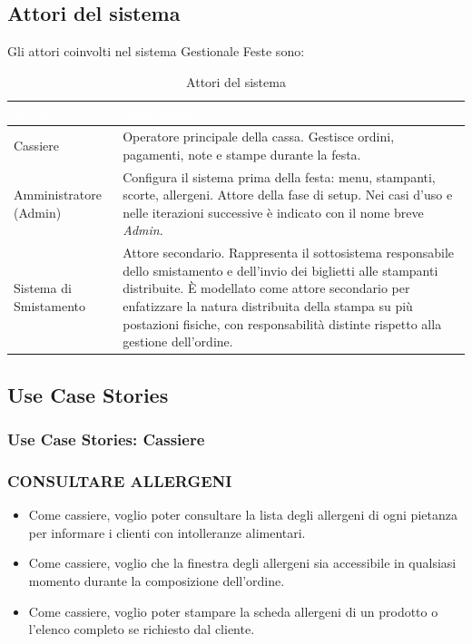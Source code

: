 
\subsection{Attori del sistema}
Gli attori coinvolti nel sistema Gestionale Feste sono:

\begin{table}[H]
\centering
\renewcommand{\arraystretch}{1.5}
\begin{tabularx}{\textwidth}{|L|X|}
\hline
{}\textcolor{white}{\textbf{Attore}} &
    \textcolor{white}{\textbf{Descrizione}} \\
\hline
Cassiere &
    Operatore principale della cassa. Gestisce ordini, pagamenti, note e stampe
    durante la festa. \\
\hline
Amministratore (Admin) &
    Configura il sistema prima della festa: menu, stampanti, scorte, allergeni.
    Attore della fase di setup. Nei casi d'uso e nelle iterazioni successive è
    indicato con il nome breve \emph{Admin}. \\
\hline
Sistema di Smistamento &
    Attore secondario. Rappresenta il sottosistema responsabile dello smistamento
    e dell'invio dei biglietti alle stampanti distribuite. \`E modellato come attore
    secondario per enfatizzare la natura distribuita della stampa su più postazioni
    fisiche, con responsabilità distinte rispetto alla gestione dell'ordine. \\
\hline
\end{tabularx}
\caption{Attori del sistema}
\end{table}

% 
\subsection{Use Case Stories}

\subsubsection{Use Case Stories: Cassiere}

\subsubsection*{CONSULTARE ALLERGENI}
\begin{itemize}
    \item Come cassiere, voglio poter consultare la lista degli allergeni di ogni pietanza per informare i clienti con intolleranze alimentari.
    \item Come cassiere, voglio che la finestra degli allergeni sia accessibile in qualsiasi momento durante la composizione dell'ordine.
    \item Come cassiere, voglio poter stampare la scheda allergeni di un prodotto o l'elenco completo se richiesto dal cliente.
\end{itemize}

